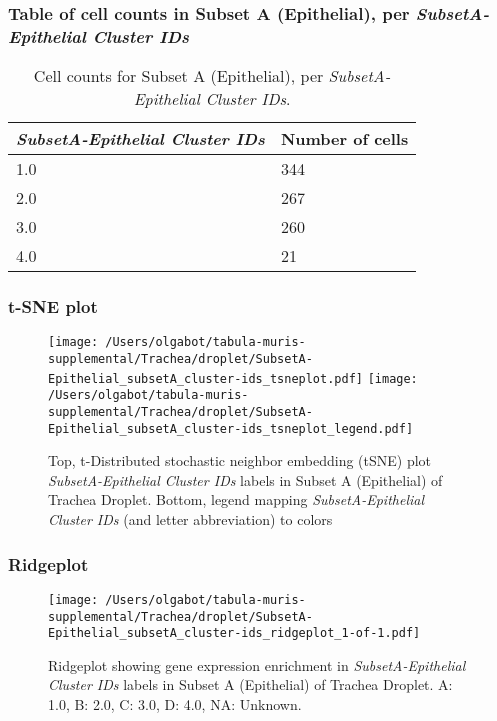 \subsubsection{Table of cell counts in Subset A (Epithelial), per \emph{SubsetA-Epithelial Cluster IDs}}\begin{table}[h]
\centering
\label{my-label}
\begin{tabular}{@{}ll@{}}
\toprule

\emph{SubsetA-Epithelial Cluster IDs}& Number of cells \\ \midrule
1.0 & 344 \\

2.0 & 267 \\

3.0 & 260 \\

4.0 & 21 \\
\bottomrule
\end{tabular}
\caption{Cell counts for Subset A (Epithelial), per \emph{SubsetA-Epithelial Cluster IDs}.}
\end{table}

\clearpage
\subsubsection{t-SNE plot}
\begin{figure}[h]
\centering
\texttt{[image: /Users/olgabot/tabula-muris-supplemental/Trachea/droplet/SubsetA-Epithelial\_subsetA\_cluster-ids\_tsneplot.pdf]}
\texttt{[image: /Users/olgabot/tabula-muris-supplemental/Trachea/droplet/SubsetA-Epithelial\_subsetA\_cluster-ids\_tsneplot\_legend.pdf]}
\caption{Top, t-Distributed stochastic neighbor embedding (tSNE) plot  \emph{SubsetA-Epithelial Cluster IDs} labels in Subset A (Epithelial) of Trachea Droplet. Bottom, legend mapping \emph{SubsetA-Epithelial Cluster IDs} (and letter abbreviation) to colors}
\end{figure}


\clearpage

\subsubsection{Ridgeplot}
\begin{figure}[h]
\centering
\texttt{[image: /Users/olgabot/tabula-muris-supplemental/Trachea/droplet/SubsetA-Epithelial\_subsetA\_cluster-ids\_ridgeplot\_1-of-1.pdf]}

\caption{ Ridgeplot  showing gene expression enrichment in \emph{SubsetA-Epithelial Cluster IDs} labels in Subset A (Epithelial) of Trachea Droplet. A: 1.0, B: 2.0, C: 3.0, D: 4.0, NA: Unknown.}
\end{figure}


